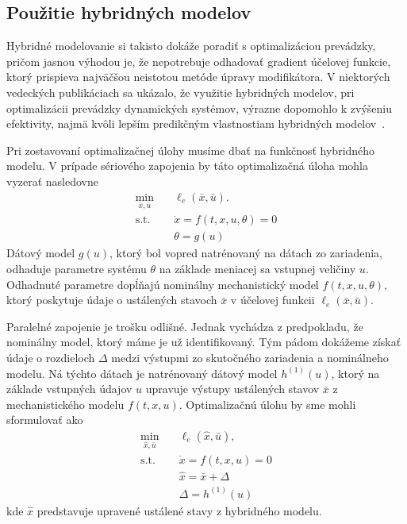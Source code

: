 \subsection{Použitie hybridných modelov}
Hybridné modelovanie si takisto dokáže poradiť s optimalizáciou prevádzky, pričom jasnou výhodou je, že nepotrebuje odhadovať gradient účelovej funkcie, ktorý prispieva najväčšou neistotou metóde úpravy modifikátora. V niektorých vedeckých publikáciach sa ukázalo, že využitie hybridných modelov, pri optimalizácii prevádzky dynamických systémov, výrazne dopomohlo k zvýšeniu efektivity, najmä kvôli lepším predikčným vlastnostiam hybridných modelov~\cite{bhutani:hybrid_modelling_opt:2006}. 

Pri zostavovaní optimalizačnej úlohy musíme dbať na funkčnosť hybridného modelu. V prípade sériového zapojenia by táto optimalizačná úloha mohla vyzerať nasledovne
\begin{equation}
	\begin{split}
		\min_{\bar{x},\bar{u}} &\quad \ell_e\left(\bar{x},\bar{u}\right).\\
		\text{s.t.} &\quad \dot{x} = f\left(t,x,u,\theta\right) = 0\\
		&\quad \theta = g(u)
	\end{split}
\end{equation}
Dátový model $ g(u) $, ktorý bol vopred natrénovaný na dátach zo zariadenia, odhaduje parametre systému $ \theta $ na základe meniacej sa vstupnej veličiny $ u $. Odhadnuté parametre dopĺňajú nominálny mechanistický model $ f(t,x,u,\theta) $, ktorý poskytuje údaje o ustálených stavoch $ \bar{x} $ v účelovej funkcii $ \ell_e\left(\bar{x},\bar{u}\right) $. 

Paralelné zapojenie je trošku odlišné. Jednak vychádza z predpokladu, že nominálny model, ktorý máme je už identifikovaný. Tým pádom dokážeme získať údaje o rozdieloch $ \Delta $ medzi výstupmi zo skutočného zariadenia a nominálneho modelu. Ná týchto dátach je natrénovaný dátový model $ h^{(1)}(u) $, ktorý na základe vstupných údajov $ u $ upravuje výstupy ustálených stavov $ \bar{x} $ z mechanistického modelu $ f(t,x,u) $. Optimalizačnú úlohu by sme mohli sformulovať ako
\begin{equation}
	\begin{split}
		\min_{\hat{x},\bar{u}} &\quad \ell_e\left(\hat{x},\bar{u}\right),\\
		\text{s.t.} &\quad \dot{x} = f\left(t,x,u\right) = 0\\
		&\quad \hat{x} = \bar{x} + \Delta\\
		&\quad \Delta = h^{(1)}(u)
	\end{split}
\end{equation}
kde $ \hat{x} $ predstavuje upravené ustálené stavy z hybridného modelu.

